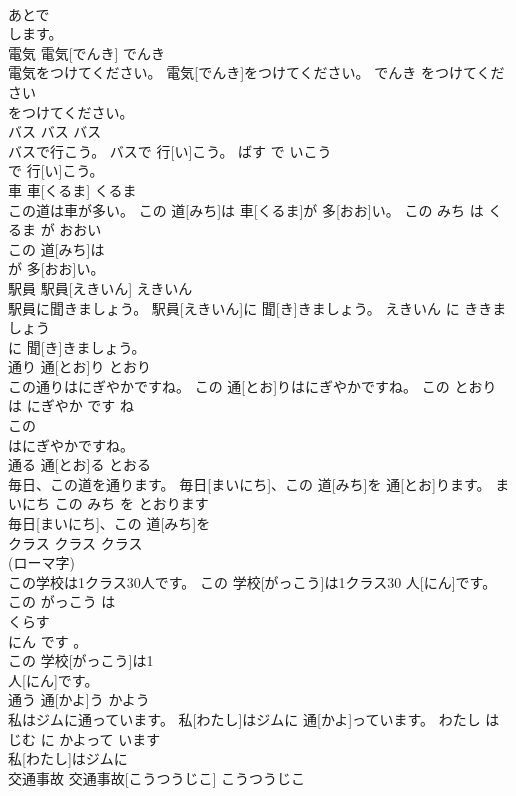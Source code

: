 \documentclass[8pt]{extreport}
\begin{document}
\begin{CJK}{UTF8}{min}
\\	あとで
\\	します。		
\\	電気	電気[でんき]	でんき	
\\	電気をつけてください。	電気[でんき]をつけてください。	でんき をつけてください	
\\	をつけてください。		
\\	バス	バス	バス	
\\	バスで行こう。	バスで 行[い]こう。	ばす で いこう	
\\	で 行[い]こう。		
\\	車	車[くるま]	くるま	
\\	この道は車が多い。	この 道[みち]は 車[くるま]が 多[おお]い。	この みち は くるま が おおい	
\\	この 道[みち]は
\\	が 多[おお]い。		
\\	駅員	駅員[えきいん]	えきいん	
\\	駅員に聞きましょう。	駅員[えきいん]に 聞[き]きましょう。	えきいん に ききましょう	
\\	に 聞[き]きましょう。		
\\	通り	通[とお]り	とおり	
\\	この通りはにぎやかですね。	この 通[とお]りはにぎやかですね。	この とおり は にぎやか です ね	
\\	この
\\	はにぎやかですね。		
\\	通る	通[とお]る	とおる	
\\	毎日、この道を通ります。	毎日[まいにち]、この 道[みち]を 通[とお]ります。	まいにち この みち を とおります	
\\	毎日[まいにち]、この 道[みち]を
\\	クラス	クラス	クラス	
\\	(ローマ字)		
\\	この学校は1クラス30人です。	この 学校[がっこう]は1クラス30 人[にん]です。	この がっこう は 
\\	くらす 
\\	にん です 。	
\\	この 学校[がっこう]は1
\\	人[にん]です。		
\\	通う	通[かよ]う	かよう	
\\	私はジムに通っています。	私[わたし]はジムに 通[かよ]っています。	わたし は じむ に かよって います	
\\	私[わたし]はジムに
\\	交通事故	交通事故[こうつうじこ]	こうつうじこ	

\end{CJK}
\end{document}
